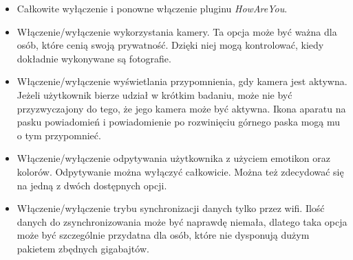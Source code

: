 \begin{itemize}
	\item Całkowite wyłączenie i ponowne włączenie pluginu \textit{HowAreYou}.
	
	\item Włączenie/wyłączenie wykorzystania kamery. Ta opcja może być ważna dla osób, które cenią swoją prywatność. Dzięki niej mogą kontrolować, kiedy dokładnie wykonywane są fotografie.
	
	\item Włączenie/wyłączenie wyświetlania przypomnienia, gdy kamera jest aktywna. Jeżeli użytkownik bierze udział w krótkim badaniu, może nie być przyzwyczajony do tego, że jego kamera może być aktywna. Ikona aparatu na pasku powiadomień i powiadomienie po rozwinięciu górnego paska mogą mu o tym przypomnieć.
	
	\item Włączenie/wyłączenie odpytywania użytkownika z użyciem emotikon oraz kolorów. Odpytywanie można wyłączyć całkowicie. Można też zdecydować się na jedną z dwóch dostępnych opcji.
	
	\item Włączenie/wyłączenie trybu synchronizacji danych tylko przez wifi. Ilość danych do zsynchronizowania może być naprawdę niemała, dlatego taka opcja może być szczególnie przydatna dla osób, które nie dysponują dużym pakietem zbędnych gigabajtów.
	

\end{itemize}
